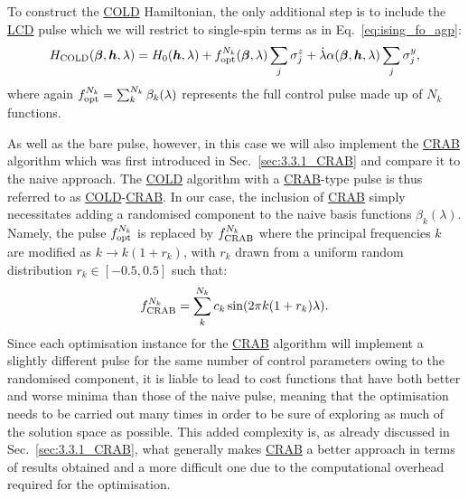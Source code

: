 \documentclass[a4paper,oneside,11pt]{book}
\newcommand{\betabb}{\boldsymbol{\beta}}
\newcommand{\hbb}{\boldsymbol{h}}
\newcommand{\sy}{\sigma^y}
\newcommand{\sz}{\sigma^z}
\newcommand{\dotlambda}{\dot{\lambda}}
\newcommand{\acrref}[1]{\hyperref[acr:#1]{#1}}
\begin{document}
To construct the \acrref{COLD} Hamiltonian, the only additional step is to include the \acrref{LCD} pulse which we will restrict to single-spin terms as in Eq.~\eqref{eq:ising_fo_agp}:
\begin{equation}
    H_{\rm COLD}(\betabb, \hbb, \lambda) = H_0(\hbb, \lambda) + f_{\rm opt}^{N_k}(\betabb, \lambda)\sum_j \sz_j + \dotlambda \alpha(\betabb, \hbb, \lambda)\sum_j \sy_j,
\end{equation}
where again $f_{\rm opt}^{N_k} = \sum_k^{N_k} \beta_k(\lambda)$ represents the full control pulse made up of $N_k$ functions. 

As well as the bare pulse, however, in this case we will also implement the \acrref{CRAB} algorithm which was first introduced in Sec.~\ref{sec:3.3.1_CRAB} and compare it to the naive approach. The \acrref{COLD} algorithm with a \acrref{CRAB}-type pulse is thus referred to as \acrref{COLD}-\acrref{CRAB}. In our case, the inclusion of \acrref{CRAB} simply necessitates adding a randomised component to the naive basis functions $\beta_k(\lambda)$. Namely, the pulse $f_{\rm opt}^{N_k}$ is replaced by $f_{\rm CRAB}^{N_k}$ where the principal frequencies $k$ are modified as $k \rightarrow k(1+r_k)$, with $r_k$ drawn from a uniform random distribution $r_k \in [-0.5,0.5]$ such that:
\begin{equation}\label{eq:ising_crab_pulse}
    f_{\rm CRAB}^{N_k} = \sum_k^{N_k} c_k \sin(2 \pi k(1+r_k)\lambda).
\end{equation}
Since each optimisation instance for the \acrref{CRAB} algorithm will implement a slightly different pulse for the same number of control parameters owing to the randomised component, it is liable to lead to cost functions that have both better and worse minima than those of the naive pulse, meaning that the optimisation needs to be carried out many times in order to be sure of exploring as much of the solution space as possible. This added complexity is, as already discussed in Sec.~\ref{sec:3.3.1_CRAB}, what generally makes \acrref{CRAB} a better approach in terms of results obtained and a more difficult one due to the computational overhead required for the optimisation.  
\end{document}
